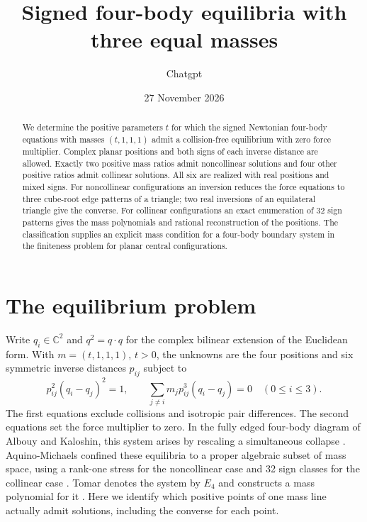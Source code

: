 \documentclass[11pt]{article}
\title{Signed four-body equilibria with three equal masses}
\author{Chatgpt}
\date{27 November 2026}
\newcommand{\C}{\mathbb C}
\begin{document}
\maketitle
\begin{abstract}
We determine the positive parameters $t$ for which the signed Newtonian four-body equations with masses $(t,1,1,1)$ admit a collision-free equilibrium with zero force multiplier. Complex planar positions and both signs of each inverse distance are allowed. Exactly two positive mass ratios admit noncollinear solutions and four other positive ratios admit collinear solutions. All six are realized with real positions and mixed signs. For noncollinear configurations an inversion reduces the force equations to three cube-root edge patterns of a triangle; two real inversions of an equilateral triangle give the converse. For collinear configurations an exact enumeration of 32 sign patterns gives the mass polynomials and rational reconstruction of the positions. The classification supplies an explicit mass condition for a four-body boundary system in the finiteness problem for planar central configurations.
\end{abstract}

\section{The equilibrium problem}
Write $q_i\in\C^2$ and $q^2=q\cdot q$ for the complex bilinear extension of the Euclidean form. With $m=(t,1,1,1)$, $t>0$, the unknowns are the four positions and six symmetric inverse distances $p_{ij}$ subject to
\begin{equation}\label{eq}
 p_{ij}^2(q_i-q_j)^2=1,\qquad
 \sum_{j\ne i}m_jp_{ij}^3(q_i-q_j)=0\quad(0\leq i\leq 3).
\end{equation}
The first equations exclude collisions and isotropic pair differences. The second equations set the force multiplier to zero. In the fully edged four-body diagram of Albouy and Kaloshin, this system arises by rescaling a simultaneous collapse \cite[\S5.5]{AK}. Aquino-Michaels confined these equilibria to a proper algebraic subset of mass space, using a rank-one stress for the noncollinear case and 32 sign classes for the collinear case \cite[\S5]{Aq}. Tomar denotes the system by $E_4$ and constructs a mass polynomial for it \cite[\S7.2]{Tomar}. Here we identify which positive points of one mass line actually admit solutions, including the converse for each point.
\end{document}
